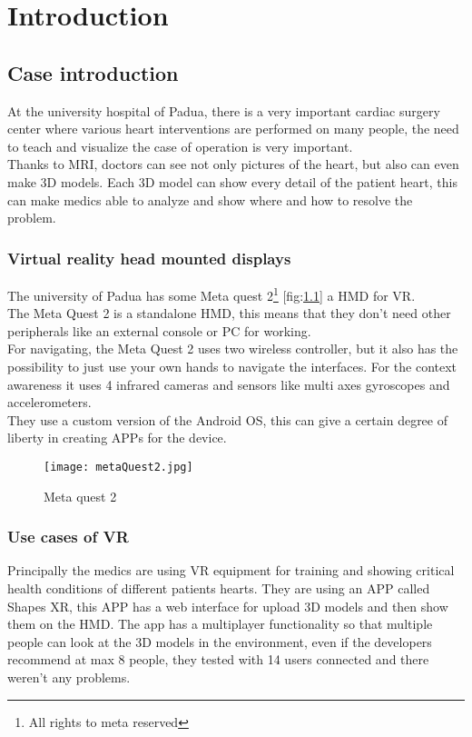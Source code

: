 
\chapter{Introduction}
\label{chp:intro}

\section{Case introduction}

At the university hospital of Padua, 
there is a very important cardiac surgery center where various heart interventions are performed on many people,
the need to teach and visualize the case of operation is very important. \\
Thanks to MRI, doctors can see not only pictures of the heart, but also can even make 3D models.
Each 3D model can show every detail of the patient heart, this can make medics able to analyze and show where and how to resolve the problem.

\subsection{Virtual reality head mounted displays}

The university of Padua has some Meta quest 2\footnote{All rights to meta reserved} [fig:\ref{fig:metaQuest2}] a \ac{HMD} for \ac{VR}. \\
The Meta Quest 2 is a standalone \ac{HMD}, this means that they don't need other peripherals like an external console or \ac{PC} for working.\\
For navigating, the Meta Quest 2 uses two wireless controller, but it also has the possibility to just use your own hands to navigate the interfaces.
For the context awareness it uses 4 infrared cameras and sensors like multi axes gyroscopes and accelerometers.\\
They use a custom version of the Android \ac{OS}, this can give a certain degree of liberty in creating APPs for the device.

\begin{figure}[h]
  \centering
  \texttt{[image: metaQuest2.jpg]}
  \caption{Meta quest 2}
  \label{fig:metaQuest2}
\end{figure}

\subsection{Use cases of VR}
Principally the medics are using VR equipment for training and showing critical health conditions of different patients hearts.
They are using an APP called Shapes XR, this APP has a web interface for upload 3D models and then show them on the \ac{HMD}.
The app has a multiplayer functionality so that multiple people can look at the 3D models in the environment, even if the developers recommend at max 8 people, they tested with 14 users connected and there weren't any problems.

